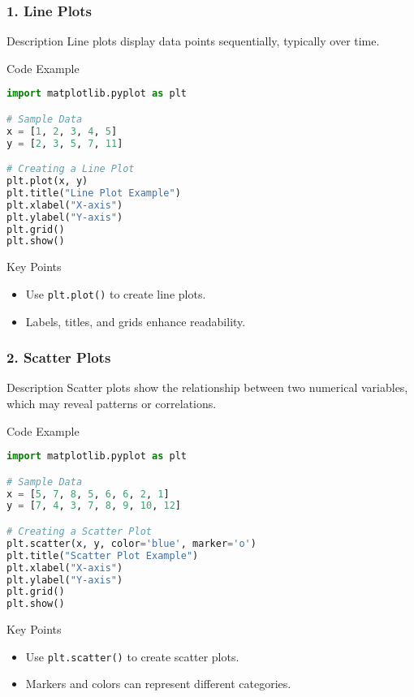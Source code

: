 \documentclass{beamer}
\begin{document}
\begin{frame}[fragile]
    \frametitle{1. Line Plots}
    \begin{block}{Description}
        Line plots display data points sequentially, typically over time.
    \end{block}
    
    \begin{block}{Code Example}
    \begin{lstlisting}[language=Python]
import matplotlib.pyplot as plt

# Sample Data
x = [1, 2, 3, 4, 5]
y = [2, 3, 5, 7, 11]

# Creating a Line Plot
plt.plot(x, y)
plt.title("Line Plot Example")
plt.xlabel("X-axis")
plt.ylabel("Y-axis")
plt.grid()
plt.show()
    \end{lstlisting}
    \end{block}
    
    \begin{block}{Key Points}
        \begin{itemize}
            \item Use \texttt{plt.plot()} to create line plots.
            \item Labels, titles, and grids enhance readability.
        \end{itemize}
    \end{block}
\end{frame}

\begin{frame}[fragile]
    \frametitle{2. Scatter Plots}
    \begin{block}{Description}
        Scatter plots show the relationship between two numerical variables, which may reveal patterns or correlations.
    \end{block}
    
    \begin{block}{Code Example}
    \begin{lstlisting}[language=Python]
import matplotlib.pyplot as plt

# Sample Data
x = [5, 7, 8, 5, 6, 6, 2, 1]
y = [7, 4, 3, 7, 8, 9, 10, 12]

# Creating a Scatter Plot
plt.scatter(x, y, color='blue', marker='o')
plt.title("Scatter Plot Example")
plt.xlabel("X-axis")
plt.ylabel("Y-axis")
plt.grid()
plt.show()
    \end{lstlisting}
    \end{block}
    
    \begin{block}{Key Points}
        \begin{itemize}
            \item Use \texttt{plt.scatter()} to create scatter plots.
            \item Markers and colors can represent different categories.
        \end{itemize}
    \end{block}
\end{frame}
\end{document}
